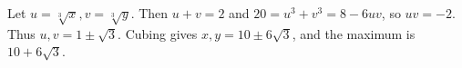 Let $u=\sqrt[3]x,v=\sqrt[3]y$. Then $u+v=2$ and $20=u^3+v^3=8-6uv$, so $uv=-2$. Thus $u,v=1\pm\sqrt3$. Cubing gives $x,y=10\pm6\sqrt3$, and the maximum is $\boxed{10+6\sqrt3}$.
